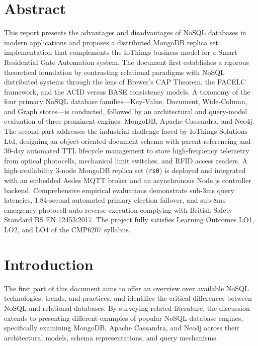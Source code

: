 \documentclass[11pt,a4paper]{article}
\begin{document}
\section*{Abstract}
\noindent This report presents the advantages and disadvantages of NoSQL databases in modern applications and proposes a distributed MongoDB replica set implementation that complements the IoThings business model for a Smart Residential Gate Automation system. The document first establishes a rigorous theoretical foundation by contrasting relational paradigms with NoSQL distributed systems through the lens of Brewer's CAP Theorem, the PACELC framework, and the ACID versus BASE consistency models. A taxonomy of the four primary NoSQL database families---Key-Value, Document, Wide-Column, and Graph stores---is conducted, followed by an architectural and query-model evaluation of three prominent engines: MongoDB, Apache Cassandra, and Neo4j. The second part addresses the industrial challenge faced by IoThings Solutions Ltd, designing an object-oriented document schema with parent-referencing and 30-day automated TTL lifecycle management to store high-frequency telemetry from optical photocells, mechanical limit switches, and RFID access readers. A high-availability 3-node MongoDB replica set (\texttt{rs0}) is deployed and integrated with an embedded Aedes MQTT broker and an asynchronous Node.js controller backend. Comprehensive empirical evaluations demonstrate sub-3ms query latencies, 1.84-second automated primary election failover, and sub-8ms emergency photocell auto-reverse execution complying with British Safety Standard BS EN 12453:2017. The project fully satisfies Learning Outcomes LO1, LO2, and LO4 of the CMP6207 syllabus.
\newpage

\section{Introduction}

The first part of this document aims to offer an overview over available NoSQL technologies, trends, and practices, and identifies the critical differences between NoSQL and relational databases. By surveying related literature, the discussion extends to presenting different examples of popular NoSQL database engines, specifically examining MongoDB, Apache Cassandra, and Neo4j across their architectural models, schema representations, and query mechanisms.
\end{document}
